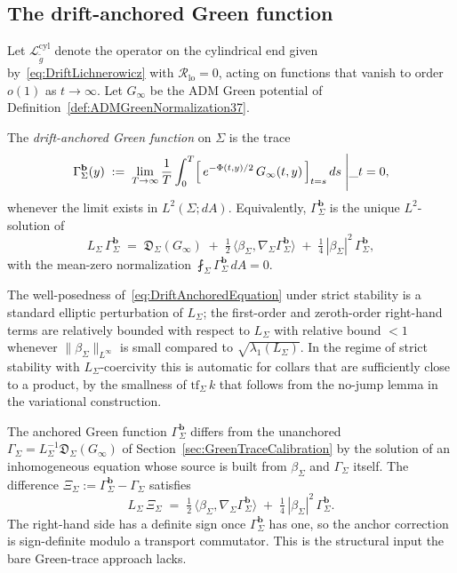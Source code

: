 \subsection{The drift-anchored Green function}

Let $\mathcal L_{\widetilde g}^{\mathrm{cyl}}$ denote the operator on the cylindrical end given by~\eqref{eq:DriftLichnerowicz} with $\mathcal R_{\mathrm{lo}}=0$, acting on functions that vanish to order $o(1)$ as $t\to\infty$. Let $G_\infty$ be the ADM Green potential of Definition~\ref{def:ADMGreenNormalization37}.

\begin{definition}\label{def:DriftAnchoredGreen}
The \emph{drift-anchored Green function} on $\Sigma$ is the trace
\[
    \Gamma_\Sigma^{\mathbf b}(y)\;:=\;\lim_{T\to\infty}\frac1T\int_0^T \Bigl[\,e^{-\Phi(t,y)/2}\,G_\infty(t,y)\,\Bigr]_{t=s}\,ds \;\Bigg|\_{t=0} ,
\]
whenever the limit exists in $L^2(\Sigma;dA)$. Equivalently, $\Gamma_\Sigma^{\mathbf b}$ is the unique $L^2$-solution of
\begin{equation}\label{eq:DriftAnchoredEquation}
    L_\Sigma\,\Gamma_\Sigma^{\mathbf b}
    \;=\;
    \mathfrak D_\Sigma(G_\infty)
    \;+\;\tfrac12\,\bigl\langle\beta_\Sigma,\nabla_\Sigma\Gamma_\Sigma^{\mathbf b}\bigr\rangle
    \;+\;\tfrac14\,|\beta_\Sigma|^2\,\Gamma_\Sigma^{\mathbf b},
\end{equation}
with the mean-zero normalization $\fint_\Sigma\Gamma_\Sigma^{\mathbf b}\,dA=0$.
\end{definition}

The well-posedness of~\eqref{eq:DriftAnchoredEquation} under strict stability is a standard elliptic perturbation of $L_\Sigma$; the first-order and zeroth-order right-hand terms are relatively bounded with respect to $L_\Sigma$ with relative bound $<1$ whenever $\|\beta_\Sigma\|_{L^\infty}$ is small compared to $\sqrt{\lambda_1(L_\Sigma)}$. In the regime of strict stability with $L_\Sigma$-coercivity this is automatic for collars that are sufficiently close to a product, by the smallness of $\mathrm{tf}_\Sigma\,k$ that follows from the no-jump lemma in the variational construction.

\begin{remark}
The anchored Green function $\Gamma_\Sigma^{\mathbf b}$ differs from the unanchored $\Gamma_\Sigma=L_\Sigma^{-1}\mathfrak D_\Sigma(G_\infty)$ of Section~\ref{sec:GreenTraceCalibration} by the solution of an inhomogeneous equation whose source is built from $\beta_\Sigma$ and $\Gamma_\Sigma$ itself. The difference $\Xi_\Sigma:=\Gamma_\Sigma^{\mathbf b}-\Gamma_\Sigma$ satisfies
\begin{equation}\label{eq:AnchorCorrectionEquation}
    L_\Sigma\,\Xi_\Sigma
    \;=\;
    \tfrac12\,\langle\beta_\Sigma,\nabla_\Sigma\Gamma_\Sigma^{\mathbf b}\rangle
    \;+\;\tfrac14\,|\beta_\Sigma|^2\,\Gamma_\Sigma^{\mathbf b}.
\end{equation}
The right-hand side has a definite sign once $\Gamma_\Sigma^{\mathbf b}$ has one, so the anchor correction is sign-definite modulo a transport commutator. This is the structural input the bare Green-trace approach lacks.
\end{remark}

